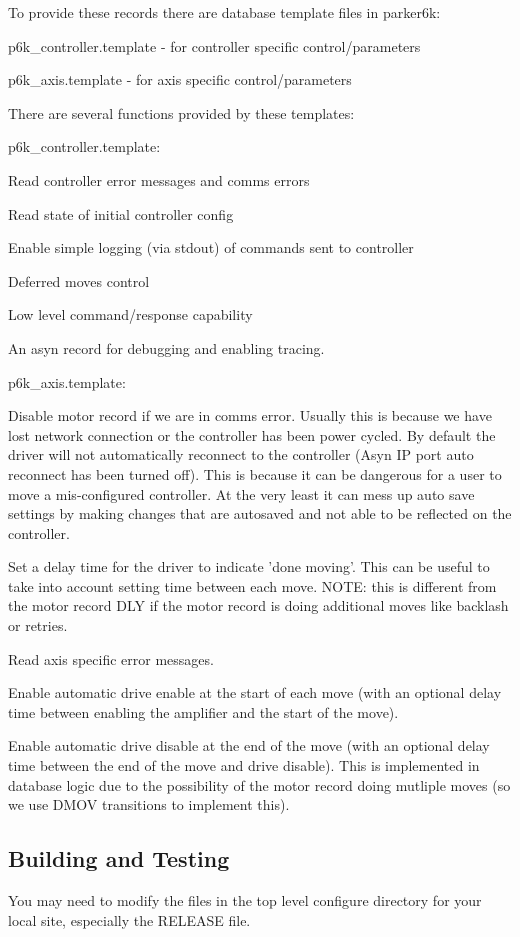 To provide these records there are database template files in parker6k:

{\ttfamily p6k\_\-controller.template} -\/ for controller specific control/parameters\par
 {\ttfamily p6k\_\-axis.template} -\/ for axis specific control/parameters\par


There are several functions provided by these templates:

p6k\_\-controller.template: 
\begin{DoxyItemize}
\item Read controller error messages and comms errors 
\item Read state of initial controller config 
\item Enable simple logging (via stdout) of commands sent to controller 
\item Deferred moves control 
\item Low level command/response capability 
\item An asyn record for debugging and enabling tracing. 
\end{DoxyItemize}

p6k\_\-axis.template: 
\begin{DoxyItemize}
\item Disable motor record if we are in comms error. Usually this is because we have lost network connection or the controller has been power cycled. By default the driver will not automatically reconnect to the controller (Asyn IP port auto reconnect has been turned off). This is because it can be dangerous for a user to move a mis-\/configured controller. At the very least it can mess up auto save settings by making changes that are autosaved and not able to be reflected on the controller. 
\item Set a delay time for the driver to indicate 'done moving'. This can be useful to take into account setting time between each move. NOTE: this is different from the motor record DLY if the motor record is doing additional moves like backlash or retries. 
\item Read axis specific error messages. 
\item Enable automatic drive enable at the start of each move (with an optional delay time between enabling the amplifier and the start of the move). 
\item Enable automatic drive disable at the end of the move (with an optional delay time between the end of the move and drive disable). This is implemented in database logic due to the possibility of the motor record doing mutliple moves (so we use DMOV transitions to implement this). 
\end{DoxyItemize}\hypertarget{index_building}{}\subsection{Building and Testing}\label{index_building}
You may need to modify the files in the top level configure directory for your local site, especially the RELEASE file.

